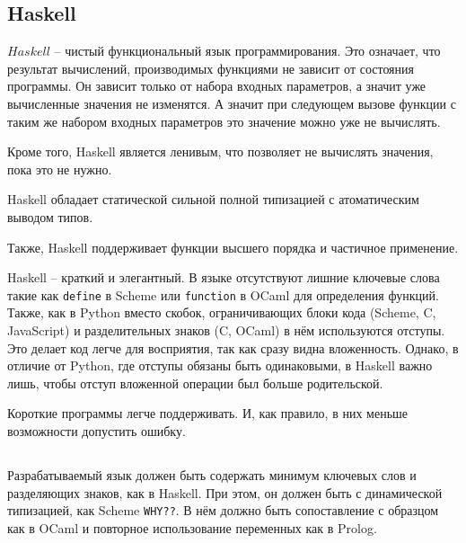     \subsection{Haskell}
        $Haskell$ -- чистый функциональный язык программирования.
        Это означает, что результат вычислений, производимых функциями не зависит от состояния программы.
        Он зависит только от набора входных параметров, а значит уже вычисленные значения не изменятся.
        А значит при следующем вызове функции с таким же набором входных параметров это значение можно уже не вычислять.

        Кроме того, Haskell является ленивым, что позволяет не вычислять значения, пока это не нужно.

        Haskell обладает статической сильной полной типизацией с атоматическим выводом типов.
        
        Также, Haskell поддерживает функции высшего порядка и частичное применение.

        Haskell -- краткий и элегантный.\cite{haskell}
        В языке отсутствуют лишние ключевые слова такие как \verb!define! в Scheme или \verb!function! в OCaml для определения функций.
        Также, как в Python вместо скобок, ограничивающих блоки кода (Scheme, C, JavaScript) и разделительных знаков (C, OCaml) в нём используются отступы.
        Это делает код легче для восприятия, так как сразу видна вложенность.
        Однако, в отличие от Python, где отступы обязаны быть одинаковыми, в Haskell важно лишь, чтобы отступ вложенной операции был больше родительской.

        Короткие программы легче поддерживать.
        И, как правило, в них меньше возможности допустить ошибку.

    \subsection{}
        Разрабатываемый язык должен быть содержать минимум ключевых слов и разделяющих знаков, как в Haskell.
        При этом, он должен быть с динамической типизацией, как Scheme \verb!WHY??!.
        В нём должно быть сопоставление с образцом как в OCaml и повторное использование переменных как в Prolog.
